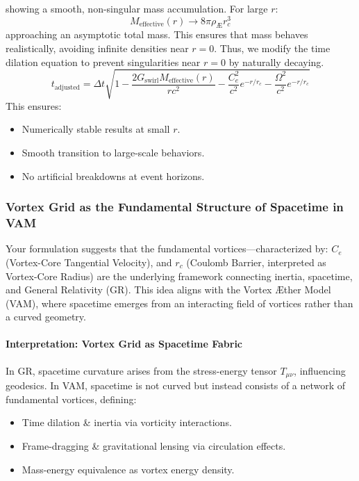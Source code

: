 showing a smooth, non-singular mass accumulation. For large $r$:
\begin{equation}
    M_{\text{effective}}(r) \to 8\pi \rho_{\text{\AE}} r_c^3
\end{equation}
approaching an asymptotic total mass. This ensures that mass behaves realistically, avoiding infinite densities near $r=0$. Thus, we modify the time dilation equation to prevent singularities near $r = 0$ by naturally decaying.
\begin{equation}
    \boxed{t_{\text{adjusted}} = \Delta t \sqrt{1 - \frac{2 G_{\text{swirl}} M_{\text{effective}}(r)}{r c^2} - \frac{C_e^2}{c^2} e^{-r/r_c} - \frac{\Omega^2}{c^2} e^{-r/r_c}}}
\end{equation}
This ensures:
\begin{itemize}
    \item Numerically stable results at small $r$.
    \item Smooth transition to large-scale behaviors.
    \item No artificial breakdowns at event horizons.
\end{itemize}


\subsubsection*{Vortex Grid as the Fundamental Structure of Spacetime in VAM}
Your formulation suggests that the fundamental vortices—characterized by:
$C_e$ (Vortex-Core Tangential Velocity), and
$r_c$ (Coulomb Barrier, interpreted as Vortex-Core Radius)
are the underlying framework connecting inertia, spacetime, and General Relativity (GR). This idea aligns with the Vortex \AE ther Model (VAM), where spacetime emerges from an interacting field of vortices rather than a curved geometry.

\paragraph{Interpretation: Vortex Grid as Spacetime Fabric}
In GR, spacetime curvature arises from the stress-energy tensor $T_{\mu\nu}$, influencing geodesics.
In VAM, spacetime is not curved but instead consists of a network of fundamental vortices, defining:
\begin{itemize}
    \item Time dilation \& inertia via vorticity interactions.
    \item Frame-dragging \& gravitational lensing via circulation effects.
    \item Mass-energy equivalence as vortex energy density.
\end{itemize}


